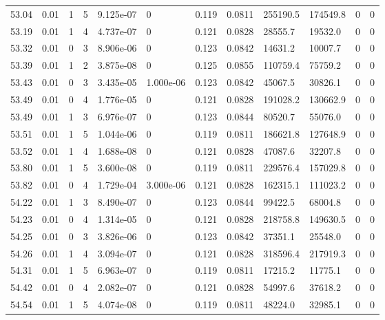 \documentclass[preview]{standalone}
\begin{document}
{{{{{{{{{{{{{{{\begin{tabular}{L{1.2cm}C{1.2cm} C{0.3cm}C{0.5cm} C{1.4cm}C{1.4cm} C{1.4cm}C{1.4cm} C{1.6cm}C{1.6cm} C{1.6cm}C{1.6cm}}
  53.04  &  0.01  & 1     &  5 &  9.125e-07  & 0  &  0.119&   0.0811& 255190.5 & 174549.8   &  0 & 0  \\ 
  53.19  &  0.01  & 1     &  4 &  4.737e-07  & 0  &  0.121&   0.0828& 28555.7 & 19532.0   &  0 & 0  \\ 
  53.32  &  0.01  & 0     &  3 &  8.906e-06  & 0  &  0.123&   0.0842& 14631.2 & 10007.7   &  0 & 0  \\ 
  53.39  &  0.01  & 1     &  2 &  3.875e-08  & 0  &  0.125&   0.0855& 110759.4 & 75759.2   &  0 & 0  \\ 
  53.43  &  0.01  & 0     &  3 &  3.435e-05  & 1.000e-06  &  0.123&   0.0842& 45067.5 & 30826.1   &  0 & 0  \\ 
  53.49  &  0.01  & 0     &  4 &  1.776e-05  & 0  &  0.121&   0.0828& 191028.2 & 130662.9   &  0 & 0  \\ 
  53.49  &  0.01  & 1     &  3 &  6.976e-07  & 0  &  0.123&   0.0844& 80520.7 & 55076.0   &  0 & 0  \\ 
  53.51  &  0.01  & 1     &  5 &  1.044e-06  & 0  &  0.119&   0.0811& 186621.8 & 127648.9   &  0 & 0  \\ 
  53.52  &  0.01  & 1     &  4 &  1.688e-08  & 0  &  0.121&   0.0828& 47087.6 & 32207.8   &  0 & 0  \\ 
  53.80  &  0.01  & 1     &  5 &  3.600e-08  & 0  &  0.119&   0.0811& 229576.4 & 157029.8   &  0 & 0  \\ 
  53.82  &  0.01  & 0     &  4 &  1.729e-04  & 3.000e-06  &  0.121&   0.0828& 162315.1 & 111023.2   &  0 & 0  \\ 
  54.22  &  0.01  & 1     &  3 &  8.490e-07  & 0  &  0.123&   0.0844& 99422.5 & 68004.8   &  0 & 0  \\ 
  54.23  &  0.01  & 0     &  4 &  1.314e-05  & 0  &  0.121&   0.0828& 218758.8 & 149630.5   &  0 & 0  \\ 
  54.25  &  0.01  & 0     &  3 &  3.826e-06  & 0  &  0.123&   0.0842& 37351.1 & 25548.0   &  0 & 0  \\ 
  54.26  &  0.01  & 1     &  4 &  3.094e-07  & 0  &  0.121&   0.0828& 318596.4 & 217919.3   &  0 & 0  \\ 
  54.31  &  0.01  & 1     &  5 &  6.963e-07  & 0  &  0.119&   0.0811& 17215.2 & 11775.1   &  0 & 0  \\ 
  54.42  &  0.01  & 0     &  4 &  2.082e-07  & 0  &  0.121&   0.0828& 54997.6 & 37618.2   &  0 & 0  \\ 
  54.54  &  0.01  & 1     &  5 &  4.074e-08  & 0  &  0.119&   0.0811& 48224.0 & 32985.1   &  0 & 0  \\ 

\end{tabular}}}}}}}}}}}}}}}}
\end{document}
